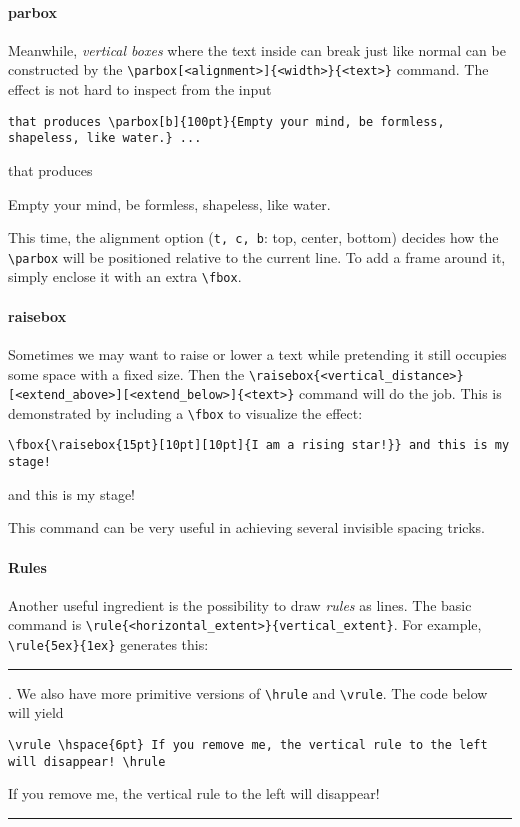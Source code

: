 \paragraph{parbox}
Meanwhile, \textit{vertical boxes} where the text inside can break just like normal can be constructed by the \texttt{\textbackslash parbox[<alignment>]\{<width>\}\{<text>\}} command. The effect is not hard to inspect from the input
\begin{lstlisting}
that produces \parbox[b]{100pt}{Empty your mind, be formless, shapeless, like water.} ...
\end{lstlisting}
that produces \parbox[b]{100pt}{Empty your mind, be formless, shapeless, like water.} This time, the alignment option (\verb|t, c, b|: top, center, bottom) decides how the \texttt{\textbackslash parbox} will be positioned relative to the current line. To add a frame around it, simply enclose it with an extra \texttt{\textbackslash fbox}.

\paragraph{raisebox}
Sometimes we may want to raise or lower a text while pretending it still occupies some space with a fixed size. Then the \texttt{\textbackslash raisebox\{<vertical\allowbreak\_distance>\}[<extend\_above>][<extend\_below>]\{<text>\}} command will do the job. This is demonstrated by including a \texttt{\textbackslash fbox} to visualize the effect:
\begin{lstlisting}
\fbox{\raisebox{15pt}[10pt][10pt]{I am a rising star!}} and this is my stage!
\end{lstlisting}
\fbox{\raisebox{15pt}[10pt][10pt]{I am a rising star!}} and this is my stage!\par
This command can be very useful in achieving several invisible spacing tricks.

\paragraph{Rules}
Another useful ingredient is the possibility to draw \textit{rules} as lines. The basic command is \texttt{\textbackslash rule\{<horizontal\_extent>\}\{vertical\_extent\}}. For example, \texttt{\textbackslash rule\{5ex\}\{1ex\}} generates this: \rule{5ex}{1ex}. We also have more primitive versions of \texttt{\textbackslash hrule} and \texttt{\textbackslash vrule}. The code below will yield
\begin{lstlisting}
\vrule \hspace{6pt} If you remove me, the vertical rule to the left will disappear! \hrule
\end{lstlisting}
\vrule \hspace{6pt} If you remove me, the vertical rule to the left will disappear!  \hrule

